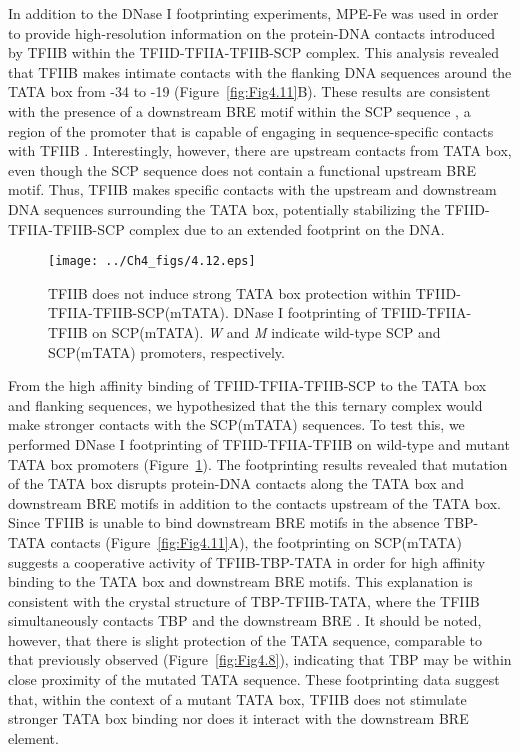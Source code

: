 \indent In addition to the DNase I footprinting experiments, MPE-Fe was used in order to provide high-resolution information on the protein-DNA contacts introduced by TFIIB within the TFIID-TFIIA-TFIIB-SCP complex. This analysis revealed that TFIIB makes intimate contacts with the flanking DNA sequences around the TATA box from -34 to -19 (Figure~\ref{fig:Fig4.11}B). These results are consistent with the presence of a downstream BRE motif within the SCP sequence \cite{Juven-Gershon_1249}, a region of the promoter that is capable of engaging in sequence-specific contacts with TFIIB \cite{Deng_2005,Tsai_2000}. Interestingly, however, there are upstream contacts from TATA box, even though the SCP sequence does not contain a functional upstream BRE motif\cite{Juven-Gershon_1249}. Thus, TFIIB makes specific contacts with the upstream and downstream DNA sequences surrounding the TATA box, potentially stabilizing the TFIID-TFIIA-TFIIB-SCP complex due to an extended footprint on the DNA. \\
\begin{figure}
\centering
\texttt{[image: ../Ch4\_figs/4.12.eps]}
\caption[TFIIB does not induce strong TATA box protection within TFIID-TFIIA-TFIIB-SCP(mTATA)]{TFIIB does not induce strong TATA box protection within TFIID-TFIIA-TFIIB-SCP(mTATA). DNase I footprinting of TFIID-TFIIA-TFIIB on SCP(mTATA). \emph{W} and \emph{M} indicate wild-type SCP and SCP(mTATA) promoters, respectively. }
\label{fig:Fig4.12}
\end{figure}
\indent From the high affinity binding of TFIID-TFIIA-TFIIB-SCP to the TATA box and flanking sequences, we hypothesized that the this ternary complex would make stronger contacts with the SCP(mTATA) sequences. To test this, we performed DNase I footprinting of TFIID-TFIIA-TFIIB on wild-type and mutant TATA box promoters (Figure~\ref{fig:Fig4.12}). The footprinting results revealed that mutation of the TATA box disrupts protein-DNA contacts along the TATA box and downstream BRE motifs in addition to the contacts upstream of the TATA box. Since TFIIB is unable to bind downstream BRE motifs in the absence TBP-TATA contacts (Figure~\ref{fig:Fig4.11}A), the footprinting on SCP(mTATA) suggests a cooperative activity of TFIIB-TBP-TATA in order for high affinity binding to the TATA box and downstream BRE motifs. This explanation is consistent with the crystal structure of TBP-TFIIB-TATA, where the TFIIB simultaneously contacts TBP and the downstream BRE \cite{Tsai_2000}. It should be noted, however, that there is slight protection of the TATA sequence, comparable to that previously observed (Figure~\ref{fig:Fig4.8}), indicating that TBP may be within close proximity of the mutated TATA sequence. These footprinting data suggest that, within the context of a mutant TATA box, TFIIB does not stimulate stronger TATA box binding nor does it interact with the downstream BRE element.\\
